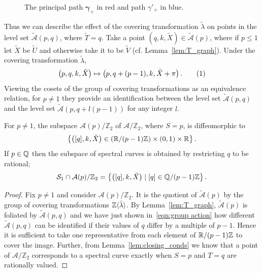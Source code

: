 \documentclass{article}
\begin{document}
\begin{figure}
{
}
\caption{The principal path $\boldsymbol{\gamma}_+$ in red and path $\gamma'_+$ in blue.\label{fig:deck_T_1}}
\end{figure}


Thus we can describe the effect of the covering transformation $\tilde{\lambda}$ on points in the level set $\mathcal{\tilde{A}}(p,q)$, where $\tilde{T} = q$. Take a point $(q,k,\tilde{X}) \in \mathcal{\tilde{A}}(p)$, where if $p\leq 1$ let $\tilde{X}$ be $\tilde{U}$ and otherwise take it to be $\tilde{V}$ (cf. Lemma~\ref{lem:T_graph}). Under the covering transformation $\tilde{\lambda}$,
\[
\bra{p,q,k,\tilde{X}} \mapsto \bra{p, q + (p-1), k, \tilde{X} + \pi}.
\labelthis{eqn:group action}
\]
Viewing the cosets of the group of covering transformations as an equivalence relation, for $p\neq 1$ they provide an identification between the level set $\mathcal{\tilde{A}}(p,q)$ and the level set $\mathcal{\tilde{A}}(p,q + l(p-1))$ for any integer $l$.

\begin{thm}\label{thm:topology_curves}
For $p\neq 1$, the subspace $\mathcal{A}(p)/\mathbb{Z}_2$ of $\mathcal{A}/\mathbb{Z}_2$, where $S=p$, is diffeomorphic to
\[
\left\{ \left([q],k,\tilde{X}\right) \in \left(\mathbb{R}/ (p-1)\mathbb{Z}\right) \times (0,1) \times \mathbb{R} \right\}.
\]
If $p\in\mathbb{Q}$ then the subspace of spectral curves is obtained by restricting $q$ to be rational;
\[
\mathcal{S}_1 \cap \mathcal{A}(p)/\mathbb{Z}_2  = \left\{ \left([q],k,\tilde{X}\right) \mid [q] \in \mathbb{Q}/ (p-1)\mathbb{Z} \right\}.
\]
\begin{proof}
Fix $p\neq 1$ and consider $\mathcal{A}(p)/\mathbb{Z}_2$. It is the quotient of $\mathcal{\tilde{A}}(p)$ by the group of covering transformations $\mathbb{Z}\langle\tilde{\lambda}\rangle$. By Lemma~\ref{lem:T_graph}, $\mathcal{\tilde{A}}(p)$ is foliated by $\mathcal{\tilde{A}}(p,q)$ and we have just shown in~\eqref{eqn:group action} how different $\mathcal{\tilde{A}}(p,q)$ can be identified if their values of $q$ differ by a multiple of $p-1$. Hence it is sufficient to take one representative from each element of $\mathbb{R}/(p-1)\mathbb{Z}$ to cover the image.
Further, from Lemma~\ref{lem:closing_conds} we know that a point of $\mathcal{A}/\mathbb{Z}_2$ corresponds to a spectral curve exactly when $S=p$ and $T=q$ are rationally valued.
\end{proof}
\end{thm}
\end{document}
